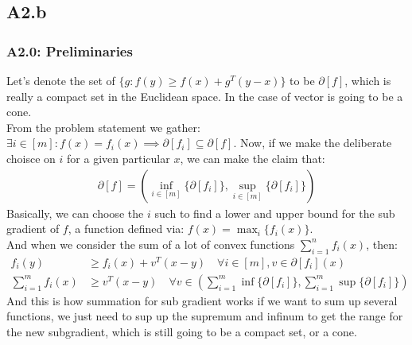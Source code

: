 \documentclass[]{article}
\begin{document}
    \subsection*{A2.b}
        \subsubsection*{A2.0: Preliminaries}
            Let's denote the set of $\{g: f(y) \ge  f(x) + g^T(y - x)\}$ to be $\partial[f]$, which is really a compact set in the Euclidean space. In the case of vector is going to be a cone. 
            \\[1.1em]
            From the problem statement we gather: $\exists i \in [m]: f(x) =f_i(x)\implies \partial[f_i]\subseteq \partial[f]$. Now, if we make the deliberate choisce on $i$ for a given particular $x$, we can make the claim that: 
            \begin{align*}\tag{A2.0.1}\label{eqn:A2.0.1}
                \partial[f]= \left(
                    \inf_{i\in[m]} \lbrace\partial[f_i]\rbrace, 
                    \sup_{i\in[m]} \lbrace\partial[f_i]\rbrace
                \right)
            \end{align*}
            Basically, we can choose the $i$ such to find a lower and upper bound for the sub gradient of $f$, a function defined via: $f(x)=\max_i\{f_i(x)\}$. 
            \\[1.1em]
            And when we consider the sum of a lot of convex functions $\sum_{i = 1}^{n}f_i(x)$, then:
            \begin{align*}\tag{A2.0.2}\label{eqn:A2.0.2}
                f_i(y) &\ge f_i(x) + v^T(x - y)  \quad \forall i \in [m], v \in \partial[f_i](x)
                \\
                \sum_{i=1}^{m}f_i(x) &\ge 
                v^T(x - y) 
                \quad \forall v \in 
                \left(
                    \sum_{i=1}^{m}\inf \{\partial [f_i]\} , \sum_{i=1}^{m} \sup\{\partial [f_i]\}
                \right)
            \end{align*}
            And this is how summation for sub gradient works if we want to sum up several functions, we just need to sup up the supremum and infinum to get the range for the new subgradient, which is still going to be a compact set, or a cone. 
\end{document}
